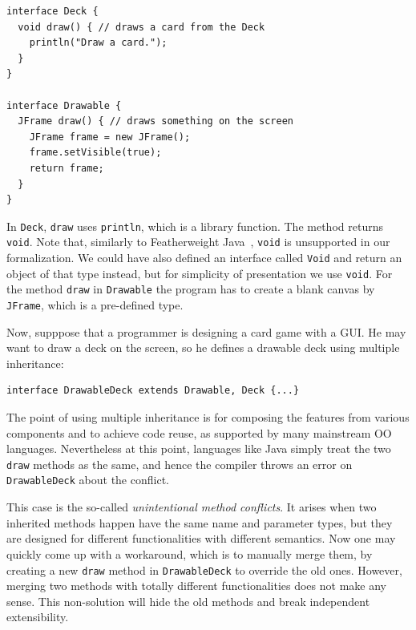 \vspace{3pt}\begin{lstlisting}
interface Deck {
  void draw() { // draws a card from the Deck
    println("Draw a card.");
  }
}

interface Drawable {
  JFrame draw() { // draws something on the screen
    JFrame frame = new JFrame();
    frame.setVisible(true);
    return frame;
  }
}
\end{lstlisting}\vspace{3pt}
In \lstinline|Deck|,
\lstinline|draw| uses \lstinline|println|, which is a
library function. 
The method returns \lstinline|void|. Note that, similarly to
Featherweight Java~\cite{}, \lstinline|void| is
unsupported in our formalization. We could have also defined an interface called \lstinline|Void|
and return an object of that type instead, but for simplicity of
presentation we use \lstinline|void|. For the method \lstinline|draw| in
\lstinline|Drawable|
the program has to create a blank canvas by \lstinline|JFrame|, which
is a pre-defined type.

Now, supppose that a programmer is designing a
card game with a GUI. He may want to draw a deck on the screen, so he defines a drawable
deck using multiple inheritance:

\vspace{3pt}\begin{lstlisting}
interface DrawableDeck extends Drawable, Deck {...} 
\end{lstlisting}\vspace{3pt}
The point of using multiple inheritance is for composing the features from various 
components and to achieve code reuse, as supported by many mainstream OO
languages. Nevertheless at this point, languages like Java simply treat the two \lstinline|draw| methods
as the same, and hence the compiler throws an error
on \lstinline|DrawableDeck| about the conflict.

This case is the so-called \textit{unintentional method conflicts}. It arises when two inherited methods happen have
the same name and parameter types, but they are designed for different functionalities with different semantics.
Now one may quickly come up with a workaround, which is to manually merge them, by
creating a new \lstinline|draw| method in \lstinline|DrawableDeck| to
override the old ones. However, merging two methods with totally different functionalities does not make any sense.
This non-solution will hide the
old methods and break independent extensibility.

